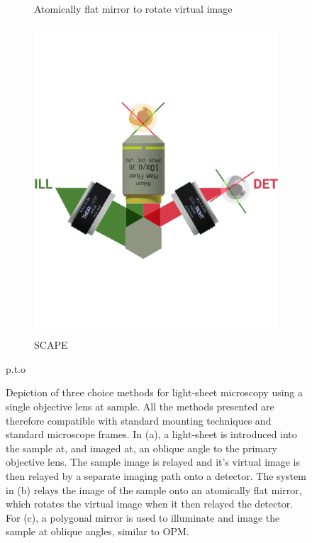 \begin{figure}
\begin{subfigure}[t]{0.475\textwidth}
    \caption{Atomically flat mirror to rotate virtual image~\cite{li_axial_2014}}\label{fig:single_objectives/atomic_mirror}
  \end{subfigure}
  \begin{subfigure}[t]{0.5\textwidth}
    \centering
    \includegraphics{single_objectives/scape}
    \caption{\gls{SCAPE}~\cite{bouchardSweptConfocallyalignedPlanar2015}}\label{fig:single_objectives/scape}
  \end{subfigure}
  \caption[]{
  p.t.o}
  \end{figure}
  \begin{figure}
    \ContinuedFloat\caption[Depiction of three choice methods for light-sheet microscopy using a single objective lens at sample]{
  Depiction of three choice methods for light-sheet microscopy using a single objective lens at sample.
  All the methods presented are therefore compatible with standard mounting techniques and standard microscope frames.
  In (a), a light-sheet is introduced into the sample at, and imaged at, an oblique angle to the primary objective lens.
  The sample image is relayed and it's virtual image is then relayed by a separate imaging path onto a detector.
  The system in (b) relays the image of the sample onto an atomically flat mirror, which rotates the virtual image when it then relayed the detector.
  For (c), a polygonal mirror is used to illuminate and image the sample at oblique angles, similar to \gls{OPM}.}\label{fig:single_objectives}
\end{figure}

